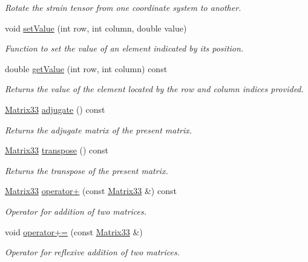 \begin{DoxyCompactItemize}
\begin{DoxyCompactList}\small\item\em Rotate the strain tensor from one coordinate system to another. \end{DoxyCompactList}\item 
void \hyperlink{classMatrix33_a6cdcec77fd089b2e73ad7ae85ecff30b}{set\-Value} (int row, int column, double value)
\begin{DoxyCompactList}\small\item\em Function to set the value of an element indicated by its position. \end{DoxyCompactList}\item 
double \hyperlink{classMatrix33_ab53b3e37ad830a87a804cf26311ba088}{get\-Value} (int row, int column) const 
\begin{DoxyCompactList}\small\item\em Returns the value of the element located by the row and column indices provided. \end{DoxyCompactList}\item 
\hyperlink{classMatrix33}{Matrix33} \hyperlink{classMatrix33_a07b999a7b1c905f3c98ba3792e6fa33f}{adjugate} () const 
\begin{DoxyCompactList}\small\item\em Returns the adjugate matrix of the present matrix. \end{DoxyCompactList}\item 
\hyperlink{classMatrix33}{Matrix33} \hyperlink{classMatrix33_a64418c1a8836b38526fdfd7ffcc79cfd}{transpose} () const 
\begin{DoxyCompactList}\small\item\em Returns the transpose of the present matrix. \end{DoxyCompactList}\item 
\hyperlink{classMatrix33}{Matrix33} \hyperlink{classMatrix33_adc58ec5739c9250ff1150c725d0e868e}{operator+} (const \hyperlink{classMatrix33}{Matrix33} \&) const 
\begin{DoxyCompactList}\small\item\em Operator for addition of two matrices. \end{DoxyCompactList}\item 
void \hyperlink{classMatrix33_acb59e59d3937e075521f478ba83b7165}{operator+=} (const \hyperlink{classMatrix33}{Matrix33} \&)
\begin{DoxyCompactList}\small\item\em Operator for reflexive addition of two matrices. \end{DoxyCompactList}\item 

\end{DoxyCompactItemize}
